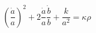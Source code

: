 \begin{equation}\label{einstein1}
(\frac{\dot{a}}{a})^2+2\frac{\dot{a}}{a}\frac{\dot{b}}{b}+\frac{k}{a^2}=\kappa\rho
\end{equation}

